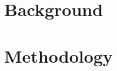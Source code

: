 \documentclass[11pt]{article}
\begin{document}
\section{Background}



\section{Methodology}\label{sec:metho}


\end{document}
